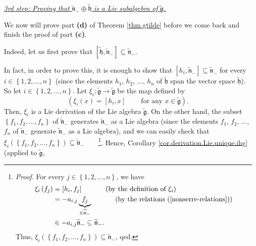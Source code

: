 \documentclass[etingof-lie.tex]{subfiles}
\begin{document}
\bigskip

\underline{\textit{3rd step: Proving that }$\widetilde{\mathfrak{n}}_{-}%
\oplus\widetilde{\mathfrak{h}}$\textit{ is a Lie subalgebra of }%
$\widetilde{\mathfrak{g}}$\textit{.}}

We now will prove part \textbf{(d)} of Theorem \ref{thm.gtilde} before we come
back and finish the proof of part \textbf{(c)}.

\begin{vershort}
Indeed, let us first prove that $\left[  \widetilde{\mathfrak{h}%
},\widetilde{\mathfrak{n}}_{-}\right]  \subseteq\widetilde{\mathfrak{n}}_{-}$.

In fact, in order to prove this, it is enough to show that $\left[
h_{i},\widetilde{\mathfrak{n}}_{-}\right]  \subseteq\widetilde{\mathfrak{n}%
}_{-}$ for every $i\in\left\{  1,2,...,n\right\}  $ (since the elements
$h_{1}$, $h_{2}$, $...$, $h_{n}$ of $\widetilde{\mathfrak{h}}$ span the vector
space $\widetilde{\mathfrak{h}}$). So let $i\in\left\{  1,2,...,n\right\}  $.
Let $\xi_{i}:\widetilde{\mathfrak{g}}\rightarrow\widetilde{\mathfrak{g}}$ be
the map defined by%
\[
\left(  \xi_{i}\left(  x\right)  =\left[  h_{i},x\right]
\ \ \ \ \ \ \ \ \ \ \text{for any }x\in\widetilde{\mathfrak{g}}\right)  .
\]
Then, $\xi_{i}$ is a Lie derivation of the Lie algebra
$\widetilde{\mathfrak{g}}$. On the other hand, the subset $\left\{
f_{1},f_{2},...,f_{n}\right\}  $ of $\widetilde{\mathfrak{n}}_{-}$ generates
$\widetilde{\mathfrak{n}}_{-}$ as a Lie algebra (since the elements $f_{1}$,
$f_{2}$, $...$, $f_{n}$ of $\widetilde{\mathfrak{n}}_{-}$ generate
$\widetilde{\mathfrak{n}}_{-}$ as a Lie algebra), and we can easily check that
$\xi_{i}\left(  \left\{  f_{1},f_{2},...,f_{n}\right\}  \right)
\subseteq\widetilde{\mathfrak{n}}_{-}$\ \ \ \ \footnote{\textit{Proof.} For
every $j\in\left\{  1,2,...,n\right\}  $, we have%
\begin{align*}
\xi_{i}\left(  f_{j}\right)   &  =\left[  h_{i},f_{j}\right]
\ \ \ \ \ \ \ \ \ \ \left(  \text{by the definition of }\xi_{i}\right) \\
&  =-a_{i,j}\underbrace{f_{j}}_{\in\widetilde{\mathfrak{n}}_{-}}%
\ \ \ \ \ \ \ \ \ \ \left(  \text{by the relations (\ref{nonserre-relations}%
)}\right) \\
&  \in-a_{i,j}\widetilde{\mathfrak{n}}_{-}\subseteq\widetilde{\mathfrak{n}%
}_{-}.
\end{align*}
Thus, $\xi_{i}\left(  \left\{  f_{1},f_{2},...,f_{n}\right\}  \right)
\subseteq\widetilde{\mathfrak{n}}_{-}$, qed.}. Hence, Corollary
\ref{cor.derivation.Lie.unique.ihg} (applied to $\widetilde{\mathfrak{g}}$,

\end{vershort}
\end{document}
